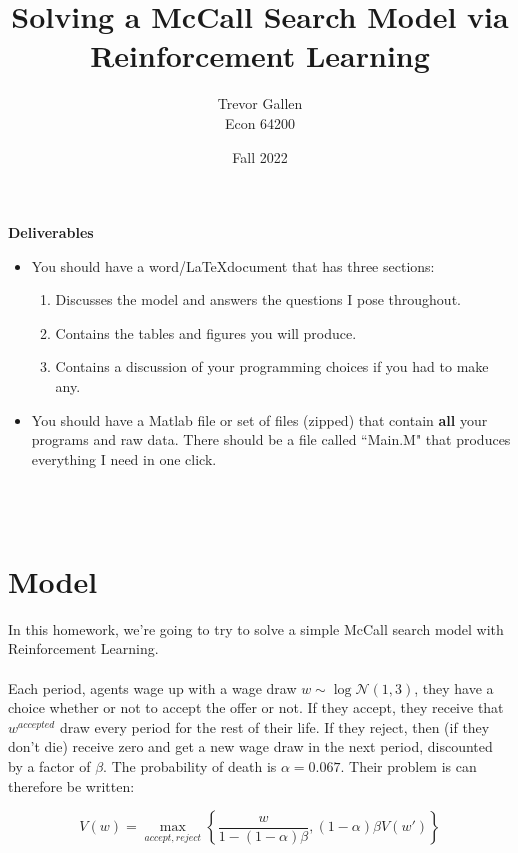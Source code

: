 \documentclass[11pt]{article}
\title{Solving a McCall Search Model via Reinforcement Learning}
\author{ Trevor Gallen \\ Econ 64200 }
\date{Fall 2022}
\begin{document}


\maketitle


\textbf{Deliverables}
\begin{itemize}
\item You should have a word/\LaTeX document that has three sections: 
\begin{enumerate}
\item Discusses the model and answers the questions I pose throughout.
\item Contains the tables and figures you will produce.
\item Contains a discussion of your programming choices if you had to make any.
\end{enumerate}
\item You should have a Matlab file or set of files (zipped) that contain \textbf{all} your programs and raw data.  There should be a file called ``Main.M" that produces everything I need in one click.
\end{itemize}
\ \\
\ \\


\section{Model}
In this homework, we're going to try to solve a simple McCall search model with Reinforcement Learning.  \\
\ \\
Each period, agents wage up with a wage draw  $w\sim\log\mathcal{N}\left(1,3\right)$, they have a choice whether or not to accept the offer or not.  If they accept, they receive that $w^{accepted}$ draw every period for the rest of their life.  If they reject, then (if they don't die) receive zero and get a new wage draw in the next period, discounted by a factor of $\beta$.  The probability of death is $\alpha=0.067$.  Their problem is can therefore be written:

$$V(w)=\underset{accept,reject}{\max}\left\{\frac{w}{1-(1-\alpha)\beta},(1-\alpha)\beta V(w')\right\}$$
\end{document}
